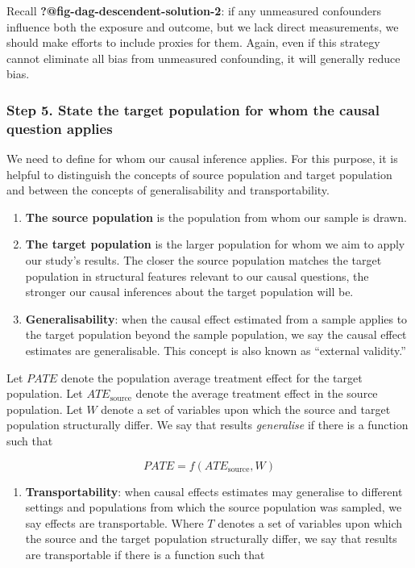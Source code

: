 \documentclass[
  singlecolumn]{article}
\providecommand{\tightlist}{%
  \setlength{\itemsep}{0pt}\setlength{\parskip}{0pt}}\usepackage{longtable,booktabs,array}
\begin{document}
Recall \textbf{?@fig-dag-descendent-solution-2}: if any unmeasured
confounders influence both the exposure and outcome, but we lack direct
measurements, we should make efforts to include proxies for them. Again,
even if this strategy cannot eliminate all bias from unmeasured
confounding, it will generally reduce bias.

\hypertarget{step-5.-state-the-target-population-for-whom-the-causal-question-applies}{%
\subsubsection{Step 5. State the target population for whom the causal
question
applies}\label{step-5.-state-the-target-population-for-whom-the-causal-question-applies}}

We need to define for whom our causal inference applies. For this
purpose, it is helpful to distinguish the concepts of source population
and target population and between the concepts of generalisability and
transportability.

\begin{enumerate}
\def\labelenumi{\arabic{enumi}.}
\item
  \textbf{The source population} is the population from whom our sample
  is drawn.
\item
  \textbf{The target population} is the larger population for whom we
  aim to apply our study's results. The closer the source population
  matches the target population in structural features relevant to our
  causal questions, the stronger our causal inferences about the target
  population will be.
\item
  \textbf{Generalisability}: when the causal effect estimated from a
  sample applies to the target population beyond the sample population,
  we say the causal effect estimates are generalisable. This concept is
  also known as ``external validity.''
\end{enumerate}

Let \(PATE\) denote the population average treatment effect for the
target population. Let \(ATE_{\text{source}}\) denote the average
treatment effect in the source population. Let \(W\) denote a set of
variables upon which the source and target population structurally
differ. We say that results \emph{generalise} if there is a function
such that

\[PATE =  f(ATE_{\text{source}}, W)\]

\begin{enumerate}
\def\labelenumi{\arabic{enumi}.}
\setcounter{enumi}{3}
\tightlist
\item
  \textbf{Transportability}: when causal effects estimates may
  generalise to different settings and populations from which the source
  population was sampled, we say effects are transportable. Where \(T\)
  denotes a set of variables upon which the source and the target
  population structurally differ, we say that results are transportable
  if there is a function such that
\end{enumerate}
\end{document}
